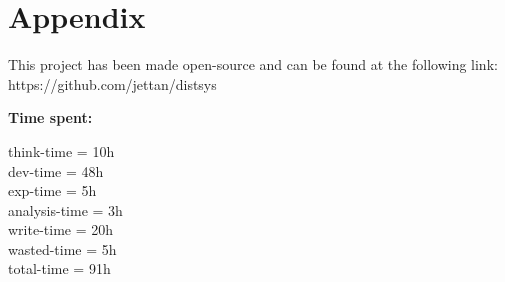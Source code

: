\documentclass[a4paper,10pt]{article}
\begin{document}
\newpage
\section*{Appendix}

This project has been made open-source and can be found at the following link:
https://github.com/jettan/distsys


\textbf{Time spent:}

think-time = 10h\\
dev-time = 48h\\
exp-time = 5h\\
analysis-time = 3h\\
write-time = 20h\\
wasted-time = 5h\\
total-time = 91h\\



\end{document}
